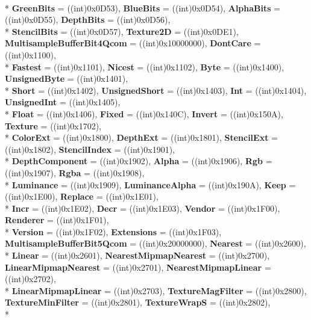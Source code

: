 \begin{DoxyCompactItemize}
\\*
{\bfseries Green\-Bits} = ((int)0x0\-D53), 
{\bfseries Blue\-Bits} = ((int)0x0\-D54), 
{\bfseries Alpha\-Bits} = ((int)0x0\-D55), 
{\bfseries Depth\-Bits} = ((int)0x0\-D56), 
\\*
{\bfseries Stencil\-Bits} = ((int)0x0\-D57), 
{\bfseries Texture2\-D} = ((int)0x0\-D\-E1), 
{\bfseries Multisample\-Buffer\-Bit4\-Qcom} = ((int)0x10000000), 
{\bfseries Dont\-Care} = ((int)0x1100), 
\\*
{\bfseries Fastest} = ((int)0x1101), 
{\bfseries Nicest} = ((int)0x1102), 
{\bfseries Byte} = ((int)0x1400), 
{\bfseries Unsigned\-Byte} = ((int)0x1401), 
\\*
{\bfseries Short} = ((int)0x1402), 
{\bfseries Unsigned\-Short} = ((int)0x1403), 
{\bfseries Int} = ((int)0x1404), 
{\bfseries Unsigned\-Int} = ((int)0x1405), 
\\*
{\bfseries Float} = ((int)0x1406), 
{\bfseries Fixed} = ((int)0x140\-C), 
{\bfseries Invert} = ((int)0x150\-A), 
{\bfseries Texture} = ((int)0x1702), 
\\*
{\bfseries Color\-Ext} = ((int)0x1800), 
{\bfseries Depth\-Ext} = ((int)0x1801), 
{\bfseries Stencil\-Ext} = ((int)0x1802), 
{\bfseries Stencil\-Index} = ((int)0x1901), 
\\*
{\bfseries Depth\-Component} = ((int)0x1902), 
{\bfseries Alpha} = ((int)0x1906), 
{\bfseries Rgb} = ((int)0x1907), 
{\bfseries Rgba} = ((int)0x1908), 
\\*
{\bfseries Luminance} = ((int)0x1909), 
{\bfseries Luminance\-Alpha} = ((int)0x190\-A), 
{\bfseries Keep} = ((int)0x1\-E00), 
{\bfseries Replace} = ((int)0x1\-E01), 
\\*
{\bfseries Incr} = ((int)0x1\-E02), 
{\bfseries Decr} = ((int)0x1\-E03), 
{\bfseries Vendor} = ((int)0x1\-F00), 
{\bfseries Renderer} = ((int)0x1\-F01), 
\\*
{\bfseries Version} = ((int)0x1\-F02), 
{\bfseries Extensions} = ((int)0x1\-F03), 
{\bfseries Multisample\-Buffer\-Bit5\-Qcom} = ((int)0x20000000), 
{\bfseries Nearest} = ((int)0x2600), 
\\*
{\bfseries Linear} = ((int)0x2601), 
{\bfseries Nearest\-Mipmap\-Nearest} = ((int)0x2700), 
{\bfseries Linear\-Mipmap\-Nearest} = ((int)0x2701), 
{\bfseries Nearest\-Mipmap\-Linear} = ((int)0x2702), 
\\*
{\bfseries Linear\-Mipmap\-Linear} = ((int)0x2703), 
{\bfseries Texture\-Mag\-Filter} = ((int)0x2800), 
{\bfseries Texture\-Min\-Filter} = ((int)0x2801), 
{\bfseries Texture\-Wrap\-S} = ((int)0x2802), 
\\*

\end{DoxyCompactItemize}
